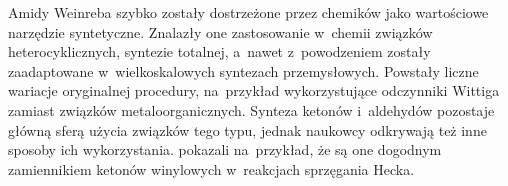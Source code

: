 Amidy Weinreba szybko zostały dostrzeżone przez chemików jako wartościowe narzędzie
  syntetyczne.
Znalazły one zastosowanie w~chemii związków heterocyklicznych, syntezie totalnej, a~nawet
  z~powodzeniem zostały zaadaptowane w~wielkoskalowych syntezach przemysłowych.
Powstały liczne wariacje oryginalnej procedury, na~przykład wykorzystujące
  odczynniki Wittiga zamiast związków metaloorganicznych.
Synteza ketonów i~aldehydów pozostaje główną sferą użycia związków tego typu,
  jednak naukowcy odkrywają też inne sposoby ich wykorzystania.
\citeauthor{baker13} pokazali na~przykład, że są one dogodnym zamiennikiem ketonów
  winylowych w~reakcjach sprzęgania Hecka.
